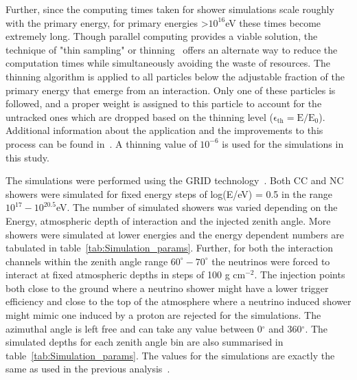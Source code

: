 Further, since the computing times taken for shower simulations scale roughly with the primary energy, for primary energies >$10^{16}$eV these times become extremely long. Though parallel computing provides a viable solution, the technique of "thin sampling" or thinning~\cite{Hillas:1997tf} offers an alternate way to reduce the computation times while simultaneously avoiding the waste of resources. The thinning algorithm is applied to all particles below the adjustable fraction of the primary energy that emerge from an interaction. Only one of these particles is followed, and a proper weight is assigned to this particle to account for the untracked ones which are dropped based on the thinning level ($\mathrm{\epsilon_{th} = E/E_0}$). Additional information about the application and the improvements to this process can be found in~\cite{Heck:1998gr,Kobal:2001jx}. A thinning value of $10^{-6}$ is used for the simulations in this study.


The simulations were performed using the GRID technology~\cite{GRID_tech,LozanoBahilo:2012pe}. Both CC and NC showers were simulated for fixed energy steps of log(E/eV) = 0.5 in the range $10^{17}-10^{20.5}$eV. The number of simulated showers was varied depending on the Energy, atmospheric depth of interaction and the injected zenith angle. More showers were simulated at lower energies and the energy dependent numbers are tabulated in table~\ref{tab:Simulation_params}. Further, for both the interaction channels within the zenith angle range $60^{\circ}-70^{\circ}$ the neutrinos were forced to interact at fixed atmospheric depths in steps of 100 g cm$^{-2}$. The injection points both close to the ground where a neutrino shower might have a lower trigger efficiency and close to the top of the atmosphere where a neutrino induced shower might mimic one induced by a proton are rejected for the simulations. The azimuthal angle is left free and can take any value between 0$^{\circ}$ and 360$^{\circ}$. The simulated depths for each zenith angle bin are also summarised in table~\ref{tab:Simulation_params}. The values for the simulations are exactly the same as used in the previous analysis~\cite{gap_note_2013}.

